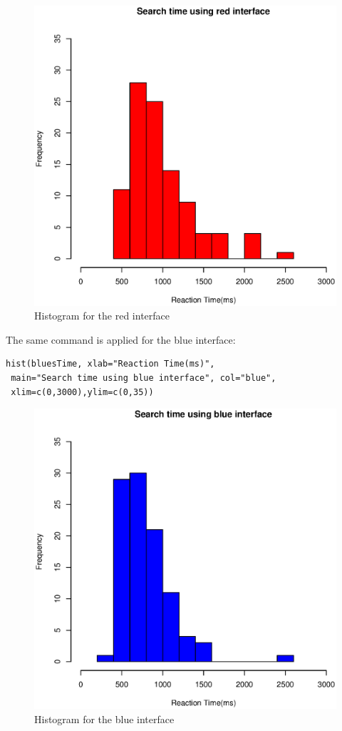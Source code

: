 \documentclass[12pt,a4paper]{scrartcl}
\begin{document}
\begin{figure}[H]
\includegraphics[scale=0.7]{Reds.eps}
\centering
\caption{Histogram for the red interface}
\end{figure}

\pagebreak
The same command is applied for the blue interface:

\begin{lstlisting}[frame=single]
hist(bluesTime, xlab="Reaction Time(ms)",
 main="Search time using blue interface", col="blue",
 xlim=c(0,3000),ylim=c(0,35))
\end{lstlisting}

\begin{figure}[H]
\includegraphics[scale=0.7]{Blues.eps}
\centering
\caption{Histogram for the blue interface}
\end{figure}
\end{document}

